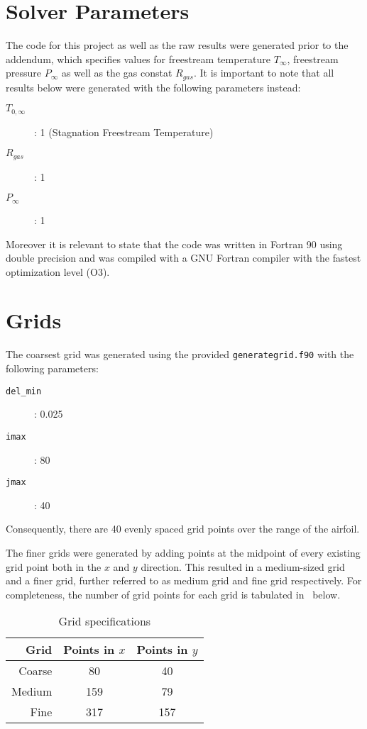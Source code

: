 \documentclass{SelimArticle}
\begin{document}
\mytitlepage
\newpage

\section{Solver Parameters}
The code for this project as well as the raw results were generated prior to the addendum, which
specifies values for freestream temperature $T_\infty$, freestream pressure $P_\infty$ as well as
the gas constat $R_{gas}$. It is important to note that all results below were generated
with the following parameters instead:
\begin{description}
    \item[$T_{0,\infty}$]: 1 (Stagnation Freestream Temperature)
    \item[$R_{gas}$]: 1
    \item[$P_\infty$]: 1
\end{description}

Moreover it is relevant to state that the code was written in Fortran 90 using double precision
and was compiled with a GNU Fortran compiler with the fastest optimization level (O3).

\section{Grids}
The coarsest grid was generated using the provided \texttt{generategrid.f90} with the following
parameters:
\begin{description}
    \item[\texttt{del\_min}]: 0.025
    \item[\texttt{imax}]: 80
    \item[\texttt{jmax}]: 40
\end{description}
Consequently, there are 40 evenly spaced grid points over the range of the airfoil.

The finer grids were generated by adding points at the midpoint of every existing grid point both
in the $x$ and $y$ direction. This resulted in a medium-sized grid and a finer grid, further
referred to as medium grid and fine grid respectively. For completeness, the number of grid
points for each grid is tabulated in~ below.

\begin{table}[H]
    \centering
    \caption{Grid specifications}\label{tab:grids}
    \begin{tabular}{@{} r c c @{}}
        \toprule
        Grid & Points in $x$ & Points in $y$ \\
        \midrule
        Coarse & 80 & 40\\
        Medium & 159 & 79\\
        Fine & 317 & 157\\
        \bottomrule
    \end{tabular}
\end{table}
\end{document}

